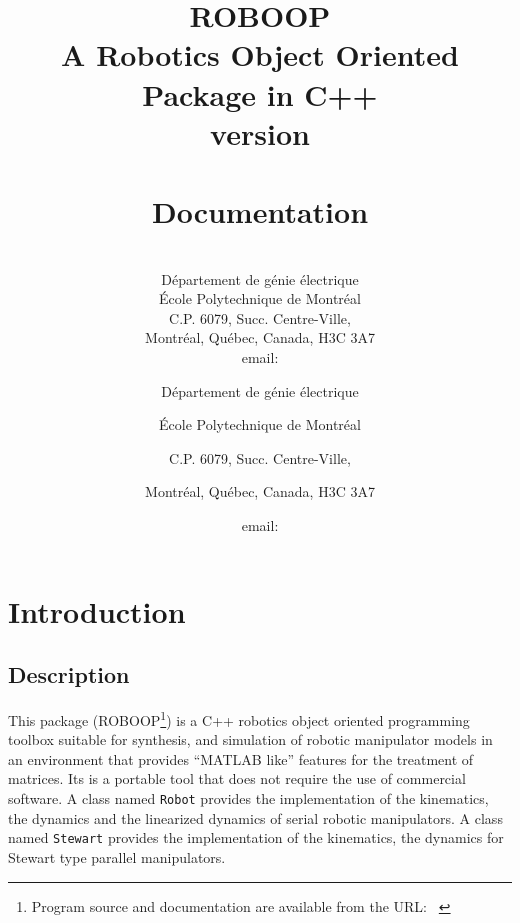 \documentclass[dvips,11pt,fleqn]{report}
\begin{document}
\title{\textsf{ROBOOP} \\ A Robotics Object Oriented Package in C++ \\ version  \\
\ \\ Documentation}

\begin{latexonly}
\author{ \\ 
D\'epartement de g\'enie \'electrique \\
\'Ecole Polytechnique de Montr\'eal \\ C.P. 6079, Succ. Centre-Ville, \\
Montr\'eal, Qu\'ebec, Canada, H3C 3A7 \\ 
email: 
}
\end{latexonly}
\begin{htmlonly}
\author{ \and
D\'epartement de g\'enie \'electrique \and
\'Ecole Polytechnique de Montr\'eal \and C.P. 6079, Succ. Centre-Ville, \and
Montr\'eal, Qu\'ebec, Canada, H3C 3A7 \and
email: 
}
\end{htmlonly}

\maketitle 

\tableofcontents

\chapter{Introduction}

\section{Description}

This package (\textsf{ROBOOP}\footnote{Program source and
  documentation are available from the URL: {\tt
    }})
is a C++ robotics object oriented programming toolbox suitable for
synthesis, and simulation of robotic manipulator models in an
environment that provides ``\textsf{MATLAB} like'' features for the
treatment of matrices. Its is a portable tool that does not require
the use of commercial software. A class named {\tt Robot} provides the
implementation of the kinematics, the dynamics and the linearized
dynamics of serial robotic manipulators. A class named {\tt Stewart}
provides the implementation of the kinematics, the dynamics for
Stewart type parallel manipulators.
\end{document}
